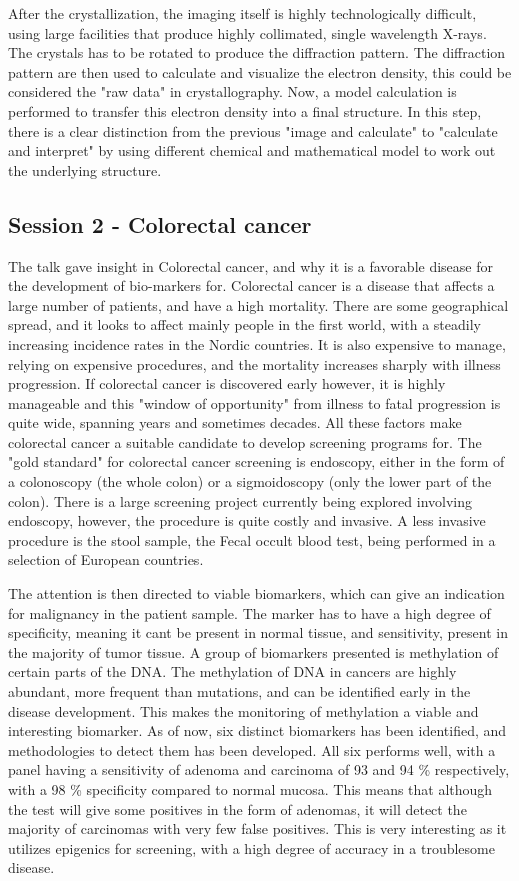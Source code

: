 \documentclass[12p]{article}
\begin{document}
After the crystallization, the imaging itself is highly technologically difficult, using large facilities that produce highly collimated, single wavelength X-rays.
The crystals has to be rotated to produce the diffraction pattern.
The diffraction pattern are then used to calculate and visualize the electron density, this could be considered the "raw data" in crystallography.
Now, a model calculation is performed to transfer this electron density into a final structure.
In this step, there is a clear distinction from the previous "image and calculate" to "calculate and interpret" by using different chemical and mathematical model to work out the underlying structure.

\subsection*{Session 2 - Colorectal cancer}

The talk gave insight in Colorectal cancer, and why it is a favorable disease for the development of bio-markers for.
Colorectal cancer is a disease that affects a large number of patients, and have a high mortality.
There are some geographical spread, and it looks to affect mainly people in the first world, with a steadily increasing incidence rates in the Nordic countries.
It is also expensive to manage, relying on expensive procedures, and the mortality increases sharply with illness progression.
If colorectal cancer is discovered early however, it is highly manageable and this "window of opportunity" from illness to fatal progression is quite wide, spanning years and sometimes decades.
All these factors make colorectal cancer a suitable candidate to develop screening programs for.
The "gold standard" for colorectal cancer screening is endoscopy, either in the form of a colonoscopy (the whole colon) or a sigmoidoscopy (only the lower part of the colon).
There is a large screening project currently being explored involving endoscopy, however, the procedure is quite costly and invasive.
A less invasive procedure is the stool sample, the Fecal occult blood test, being performed in a selection of European countries.

The attention is then directed to viable biomarkers, which can give an indication for malignancy in the patient sample.
The marker has to have a high degree of specificity, meaning it cant be present in normal tissue, and sensitivity, present in the majority of tumor tissue.
A group of biomarkers presented is methylation of certain parts of the DNA.
The methylation of DNA in cancers are highly abundant, more frequent than mutations, and can be identified early in the disease development.
This makes the monitoring of methylation a viable and interesting biomarker.
As of now, six distinct biomarkers has been identified, and methodologies to detect them has been developed.
All six performs well, with a panel having a sensitivity of adenoma and carcinoma of 93 and 94 \% respectively, with a 98 \% specificity compared to normal mucosa.
This means that although the test will give some positives in the form of adenomas, it will detect the majority of carcinomas with very few false positives.
This is very interesting as it utilizes epigenics for screening, with a high degree of accuracy in a troublesome disease.
\end{document}
